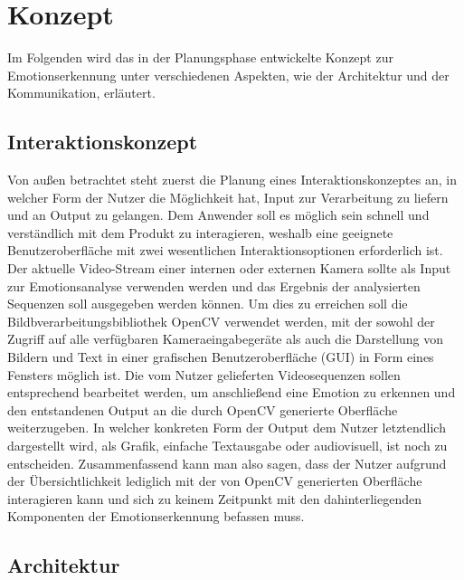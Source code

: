 \documentclass[12pt, a4paper]{report}
\begin{document}
\section{Konzept}
Im Folgenden wird das in der Planungsphase entwickelte Konzept zur Emotionserkennung unter verschiedenen Aspekten, wie der Architektur und der Kommunikation, erläutert.

\subsection{Interaktionskonzept}
Von außen betrachtet steht zuerst die Planung eines Interaktionskonzeptes an, in welcher Form der Nutzer die Möglichkeit hat, Input zur Verarbeitung zu liefern und an Output zu gelangen. Dem Anwender soll es möglich sein schnell und verständlich mit dem Produkt zu interagieren, weshalb eine geeignete Benutzeroberfläche mit zwei wesentlichen Interaktionsoptionen erforderlich ist. Der aktuelle Video-Stream einer internen oder externen Kamera sollte als Input zur Emotionsanalyse verwenden werden und das Ergebnis der analysierten Sequenzen soll ausgegeben werden können. Um dies zu erreichen soll die Bildbverarbeitungsbibliothek OpenCV verwendet werden, mit der sowohl der Zugriff auf alle verfügbaren Kameraeingabegeräte als auch die Darstellung von Bildern und Text in einer grafischen Benutzeroberfläche (GUI) in Form eines Fensters möglich ist. Die vom Nutzer gelieferten Videosequenzen sollen entsprechend bearbeitet werden, um anschließend eine Emotion zu erkennen und den entstandenen Output an die durch OpenCV generierte Oberfläche weiterzugeben. In welcher konkreten Form der Output dem Nutzer letztendlich dargestellt wird, als Grafik, einfache Textausgabe oder audiovisuell, ist noch zu entscheiden.\newline
Zusammenfassend kann man also sagen, dass der Nutzer aufgrund der Übersichtlichkeit lediglich mit der von OpenCV generierten Oberfläche interagieren kann und sich zu keinem Zeitpunkt mit den dahinterliegenden Komponenten der Emotionserkennung befassen muss.\newline

\subsection{Architektur}
\end{document}
